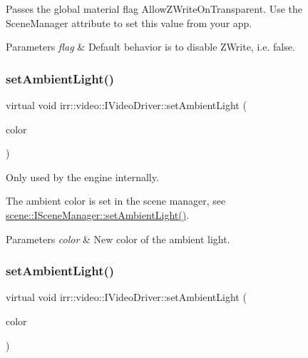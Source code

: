 Passes the global material flag Allow\+Z\+Write\+On\+Transparent. Use the Scene\+Manager attribute to set this value from your app. 
\begin{DoxyParams}{Parameters}
{\em flag} & Default behavior is to disable Z\+Write, i.\+e. false. \\
\hline
\end{DoxyParams}
\mbox{\label{classirr_1_1video_1_1IVideoDriver_aaba8d96a8061264393fc74ac9a3cd04f}} 
\subsubsection{\texorpdfstring{set\+Ambient\+Light()}{setAmbientLight()}\hspace{0.1cm}{\footnotesize\ttfamily [1/2]}}
{\footnotesize\ttfamily virtual void irr\+::video\+::\+I\+Video\+Driver\+::set\+Ambient\+Light (\begin{DoxyParamCaption}\item[{const \hyperlink{classirr_1_1video_1_1SColorf}{S\+Colorf} \&}]{color }\end{DoxyParamCaption})\hspace{0.3cm}{\ttfamily [pure virtual]}}



Only used by the engine internally. 

The ambient color is set in the scene manager, see \hyperlink{classirr_1_1scene_1_1ISceneManager_a8a424accb615c4f60fde59f55033a816}{scene\+::\+I\+Scene\+Manager\+::set\+Ambient\+Light()}. 
\begin{DoxyParams}{Parameters}
{\em color} & New color of the ambient light. \\
\hline
\end{DoxyParams}
\mbox{\label{classirr_1_1video_1_1IVideoDriver_aaba8d96a8061264393fc74ac9a3cd04f}} 
\subsubsection{\texorpdfstring{set\+Ambient\+Light()}{setAmbientLight()}\hspace{0.1cm}{\footnotesize\ttfamily [2/2]}}
{\footnotesize\ttfamily virtual void irr\+::video\+::\+I\+Video\+Driver\+::set\+Ambient\+Light (\begin{DoxyParamCaption}\item[{const \hyperlink{classirr_1_1video_1_1SColorf}{S\+Colorf} \&}]{color }\end{DoxyParamCaption})\hspace{0.3cm}{\ttfamily [pure virtual]}}



